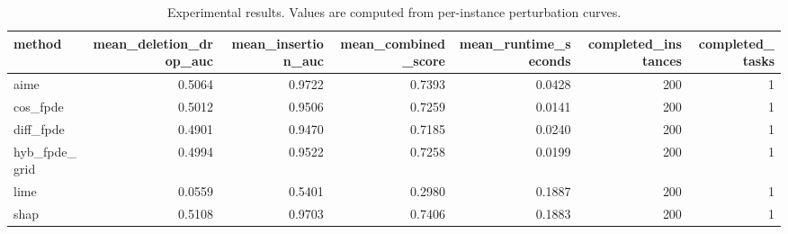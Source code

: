\begin{table}[t]
\caption{Experimental results. Values are computed from per-instance perturbation curves.}
\label{tab:main_results_computed}
\centering
\begin{tabular}{lrrrrrr}
\toprule
method & mean\_deletion\_drop\_auc & mean\_insertion\_auc & mean\_combined\_score & mean\_runtime\_seconds & completed\_instances & completed\_tasks \\
\midrule
aime & 0.5064 & 0.9722 & 0.7393 & 0.0428 & 200 & 1 \\
cos\_fpde & 0.5012 & 0.9506 & 0.7259 & 0.0141 & 200 & 1 \\
diff\_fpde & 0.4901 & 0.9470 & 0.7185 & 0.0240 & 200 & 1 \\
hyb\_fpde\_grid & 0.4994 & 0.9522 & 0.7258 & 0.0199 & 200 & 1 \\
lime & 0.0559 & 0.5401 & 0.2980 & 0.1887 & 200 & 1 \\
shap & 0.5108 & 0.9703 & 0.7406 & 0.1883 & 200 & 1 \\
\bottomrule
\end{tabular}

\end{table}
